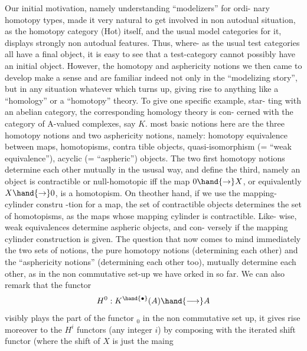 Our initial motivation,  namely understanding ``modelizers'' for ordi-%
nary homotopy types,  made it very natural to get involved in non autodual
situation,  as the homotopy category (Hot) itself,  and the usual model
categories for it,  displays strongly non autodual features. \hand{(}Thus,  where-%
as the usual test categories all have a final object,  it is easy to see
that a test-category cannot possibly have an initial object.\hand{)} However,
the homotopy and asphericity notions we then came to develop make a sense
and are familiar indeed not only in the ``modelizing story'',  but 
 in any situation whatever which turns up,  giving rise to anything like
a ``homology'' or a ``homotopy'' theory.  To give one specific example,  star-%
ting with an abelian category,  the corresponding homology theory is con-%
cerned with the category of A-valued  complexes,  say $K$.   most
basic notions here are the three homotopy notions and two asphericity
notions,  namely:  homotopy equivalence between maps,  homotopisms,  contra%
tible objects,  quasi-isomorphism (= ``weak equivalence''),  acyclic (=
``aspheric'') objects.  The two first homotopy notions determine each other
mutually in the ususal way,  and define the third,  namely an object is
contractible  \hand{(}or null-homotopic\hand{)} iff the map $0\hand{\to} X$,  or equivalently $X\hand{\to} 0$,
is a homotopism.  On the\hand{/}other hand,  if we use the mapping-cylinder constru%
-tion for a map,  the  set of contractible objects determines the set
of homotopisms,  as the maps whose mapping cylinder is contractible.  Like-%
wise,  weak equivalences determine  aspheric objects,  and con-%
versely if the mapping cylinder construction is given.  The question that
now comes to mind immediately    the two sets of notions,  the  pure
homotopy notions (determining each other)\hand{,} and the  ``asphericity notions''
(determining each other too),  mutually determine each other,  as in the
non commutative set-up we have orked in so far.  We can also remark that
the functor
\[ H^{0} : K^{\hand{\bullet}}(A) \hand{\longrightarrow} A \]
visibly plays the part of the functor \hand{$\pi$}$_{0}$ in the non commutative set up,
it gives rise moreover to the $H^{i}$ functors (any integer $i$) by composing
with the iterated shift functor  (where the shift of $X$ is just the maing

